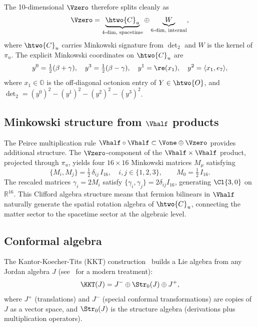 The 10-dimensional $\Vzero$ therefore splits cleanly as
\begin{equation}
\label{eq:v0-split}
\Vzero = \underbrace{\htwo{C}_u}_{4\text{-dim, spacetime}}
  \oplus \underbrace{W}_{6\text{-dim, internal}},
\end{equation}
where $\htwo{C}_u$ carries Minkowski signature from $\det_2$ and $W$ is
the kernel of $\pi_u$. The explicit Minkowski coordinates on $\htwo{C}_u$
are
\begin{equation}
\label{eq:minkowski-coords}
y^0 = \tfrac{1}{2}(\beta + \gamma), \quad
y^3 = \tfrac{1}{2}(\beta - \gamma), \quad
y^1 = \re(x_1), \quad
y^2 = \langle x_1, e_7 \rangle,
\end{equation}
where $x_1 \in \mathbb{O}$ is the off-diagonal octonion entry of $Y \in
\htwo{O}$, and $\det_2 = (y^0)^2 - (y^1)^2 - (y^2)^2 - (y^3)^2$.

\subsection{Minkowski structure from $\Vhalf$ products}

The Peirce multiplication rule $\Vhalf \circ \Vhalf \subset \Vone
\oplus \Vzero$ provides additional structure. The $\Vzero$-component
of the $\Vhalf \times \Vhalf$ product, projected through $\pi_u$,
yields four $16 \times 16$ Minkowski matrices $M_\mu$ satisfying
\begin{equation}
\label{eq:clifford}
\{M_i, M_j\} = \tfrac{1}{2}\,\delta_{ij}\, I_{16},
\quad i, j \in \{1, 2, 3\},
\qquad M_0 = \tfrac{1}{2}\, I_{16}.
\end{equation}
The rescaled matrices $\gamma_i = 2M_i$ satisfy $\{\gamma_i, \gamma_j\}
= 2\delta_{ij} I_{16}$, generating $\Cl{3,0}$ on $\mathbb{R}^{16}$.
This Clifford algebra structure means that fermion bilinears in $\Vhalf$
naturally generate the spatial rotation algebra of $\htwo{C}_u$, connecting
the matter sector to the spacetime sector at the algebraic level.

\subsection{Conformal algebra}
\label{sec:conformal}

The Kantor-Koecher-Tits (KKT) construction~\cite{Tits1962,Kantor1964,Koecher1967}
builds a Lie algebra from any Jordan algebra $J$ (see~\cite{McCrimmon2004}
for a modern treatment):
\begin{equation}
\label{eq:kkt}
\KKT(J) = J^- \oplus \Str_0(J) \oplus J^+,
\end{equation}
where $J^+$ (translations) and $J^-$ (special conformal transformations)
are copies of $J$ as a vector space, and $\Str_0(J)$ is the structure
algebra (derivations plus multiplication operators).

